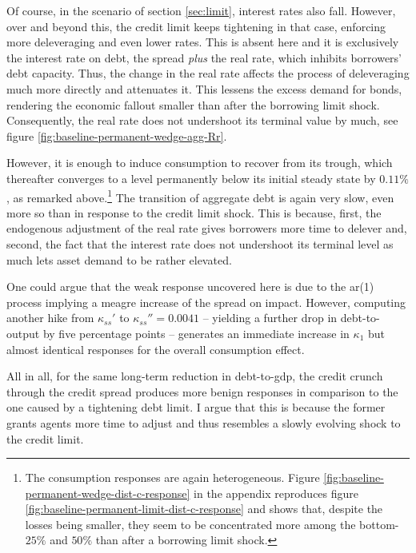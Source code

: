 \documentclass[a4paper,12pt]{article} %
\numberwithin{equation}{section} %
\numberwithin{figure}{section}
\numberwithin{table}{section}
\begin{document}
Of course, in the scenario of section \ref{sec:limit}, interest rates also fall. However, over and beyond this, the credit limit keeps tightening in that case, enforcing more deleveraging and even lower rates. This is absent here and it is exclusively the interest rate on debt, the spread \textit{plus} the real rate, which inhibits borrowers' debt capacity. Thus, the change in the real rate affects the process of deleveraging much more directly and attenuates it. This lessens the excess demand for bonds, rendering the economic fallout smaller than after the borrowing limit shock. Consequently, the real rate does not undershoot its terminal value by much, see figure \ref{fig:baseline-permanent-wedge-agg-Rr}. 

However, it is enough to induce consumption to recover from its trough, which thereafter converges to a level permanently below its initial steady state by $0.11\%$, as remarked above.\footnote{The consumption responses are again heterogeneous. Figure \ref{fig:baseline-permanent-wedge-dist-c-response} in the appendix reproduces figure \ref{fig:baseline-permanent-limit-dist-c-response} and shows that, despite the losses being smaller, they seem to be concentrated more among the bottom-$25\%$ and $50\%$ than after a borrowing limit shock.} The transition of aggregate debt is again very slow, even more so than in response to the credit limit shock. This is because, first, the endogenous adjustment of the real rate gives borrowers more time to delever and, second, the fact that the interest rate does not undershoot its terminal level as much lets asset demand to be rather elevated.


One could argue that the weak response uncovered here is due to the \Gls{ar}(1) process implying a meagre increase of the spread on impact. However, computing another hike from $\kappa_{ss}'$ to $\kappa_{ss}'' = 0.0041$ -- yielding a further drop in debt-to-output by five percentage points -- generates an immediate increase in $\kappa_1$ but almost identical responses for the overall consumption effect.

All in all, for the same long-term reduction in debt-to-\Gls{gdp}, the credit crunch through the credit spread produces more benign responses in comparison to the one caused by a tightening debt limit. I argue that this is because the former grants agents more time to adjust and thus resembles a slowly evolving shock to the credit limit.
\end{document}
